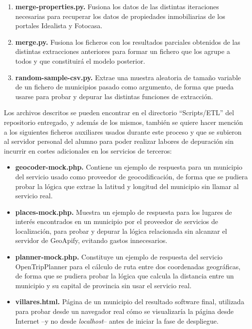 \begin{enumerate}
    
    \item \textbf{merge-properties.py.} Fusiona los datos de las distintas iteraciones necesarias para recuperar los datos de propiedades inmobiliarias de los portales Idealista y Fotocasa.
    
    \item \textbf{merge.py.} Fusiona los ficheros con los resultados parciales obtenidos de las distintas extracciones anteriores para formar un fichero que los agrupe a todos y que constituirá el modelo posterior.
    
    \item \textbf{random-sample-csv.py.} Extrae una muestra aleatoria de tamaño variable de un fichero de municipios pasado como argumento, de forma que pueda usarse para probar y depurar las distintas funciones de extracción.
\end{enumerate}

Los archivos descritos se pueden encontrar en el directorio ``Scripts/ETL'' del repositorio entregado, y además de los mismos, también se quiere hacer mención a los siguientes ficheros auxiliares usados durante este proceso y que se subieron al servidor personal del alumno para poder realizar labores de depuración sin incurrir en costes adicionales en los servicios de terceros:

\begin{itemize}
    \item \textbf{geocoder-mock.php.} Contiene un ejemplo de respuesta para un municipio del servicio usado como proveedor de geocodificación, de forma que se pudiera probar la lógica que extrae la latitud y longitud del municipio sin llamar al servicio real.
    \item \textbf{places-mock.php.} Muestra un ejemplo de respuesta para los lugares de interés encontrados en un municipio por el proveedor de servicios de localización, para probar y depurar la lógica relacionada sin alcanzar el servidor de GeoApify, evitando gastos innecesarios.
    \item \textbf{planner-mock.php.} Constituye un ejemplo de respuesta del servicio OpenTripPlanner para el cálculo de ruta entre dos coordenadas geográficas, de forma que se pudiera probar la lógica que calcula la distancia entre un municipio y su capital de provincia sin usar el servicio real.
    \item \textbf{villares.html.} Página de un municipio del resultado software final, utilizada para probar desde un navegador real cómo se visualizaría la página desde Internet –y no desde \textit{localhost}– antes de iniciar la fase de despliegue.
\end{itemize}

